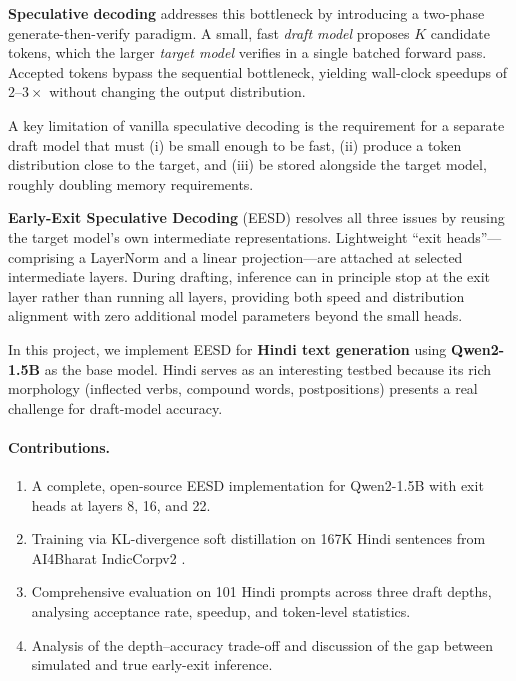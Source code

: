 \documentclass[11pt]{article}
\begin{document}
\textbf{Speculative decoding} \cite{leviathan2023fast,chen2023accelerating} addresses this bottleneck by introducing a two-phase generate-then-verify paradigm.  A small, fast \emph{draft model} proposes $K$ candidate tokens, which the larger \emph{target model} verifies in a single batched forward pass.  Accepted tokens bypass the sequential bottleneck, yielding wall-clock speedups of $2$--$3\times$ without changing the output distribution.

A key limitation of vanilla speculative decoding is the requirement for a separate draft model that must (i) be small enough to be fast, (ii) produce a token distribution close to the target, and (iii) be stored alongside the target model, roughly doubling memory requirements.

\textbf{Early-Exit Speculative Decoding} (EESD) \cite{liu2024eesd} resolves all three issues by reusing the target model's own intermediate representations.  Lightweight ``exit heads''—comprising a LayerNorm and a linear projection—are attached at selected intermediate layers.  During drafting, inference can in principle stop at the exit layer rather than running all layers, providing both speed and distribution alignment with zero additional model parameters beyond the small heads.

In this project, we implement EESD for \textbf{Hindi text generation} using \textbf{Qwen2-1.5B} \cite{yang2024qwen2} as the base model.  Hindi serves as an interesting testbed because its rich morphology (inflected verbs, compound words, postpositions) presents a real challenge for draft-model accuracy.

\paragraph{Contributions.}
\begin{enumerate}
    \item A complete, open-source EESD implementation for Qwen2-1.5B with exit heads at layers 8, 16, and 22.
    \item Training via KL-divergence soft distillation \cite{hinton2015distilling} on 167K Hindi sentences from AI4Bharat IndicCorpv2 \cite{doddapaneni2021indicnlp}.
    \item Comprehensive evaluation on 101 Hindi prompts across three draft depths, analysing acceptance rate, speedup, and token-level statistics.
    \item Analysis of the depth--accuracy trade-off and discussion of the gap between simulated and true early-exit inference.
\end{enumerate}
\end{document}
